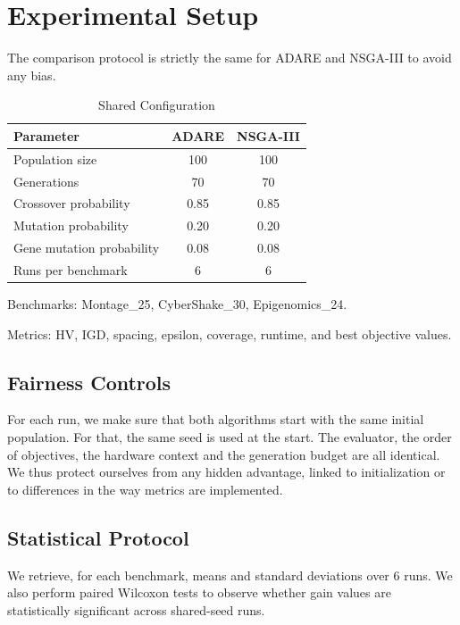 \documentclass[conference]{IEEEtran}
\begin{document}
\section{Experimental Setup}
The comparison protocol is strictly the same for ADARE and NSGA-III to avoid any bias.
\begin{table}[htbp]
\centering
\caption{Shared Configuration}
\label{tab:shared}
\begin{tabular}{lcc}
\toprule
\textbf{Parameter} & \textbf{ADARE} & \textbf{NSGA-III} \\
\midrule
Population size & 100 & 100 \\
Generations & 70 & 70 \\
Crossover probability & 0.85 & 0.85 \\
Mutation probability & 0.20 & 0.20 \\
Gene mutation probability & 0.08 & 0.08 \\
Runs per benchmark & 6 & 6 \\
\bottomrule
\end{tabular}
\end{table}

\noindent Benchmarks: Montage\_25, CyberShake\_30, Epigenomics\_24.

\noindent Metrics: HV, IGD, spacing, epsilon, coverage, runtime, and best objective values.

\subsection{Fairness Controls}
For each run, we make sure that both algorithms start with the same initial population. For that, the same seed is used at the start.
The evaluator, the order of objectives, the hardware context and the generation budget are all identical.
We thus protect ourselves from any hidden advantage, linked to initialization or to differences in the way metrics are implemented.

\subsection{Statistical Protocol}
We retrieve, for each benchmark, means and standard deviations over 6 runs.
We also perform paired Wilcoxon tests to observe whether gain values are statistically significant across shared-seed runs.
\end{document}
